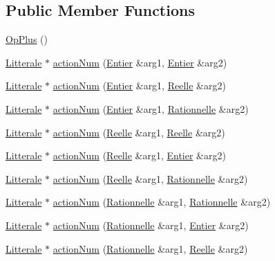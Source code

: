 \subsection*{Public Member Functions}
\begin{DoxyCompactItemize}
\item 
\hyperlink{class_op_plus_a24d0bebd30dbe0668a865ff3ec764754}{Op\+Plus} ()
\item 
\hyperlink{class_litterale}{Litterale} $\ast$ \hyperlink{class_op_plus_a8e7ac9ee5f38f2cca430f1706d584718}{action\+Num} (\hyperlink{class_entier}{Entier} \&arg1, \hyperlink{class_entier}{Entier} \&arg2)
\item 
\hyperlink{class_litterale}{Litterale} $\ast$ \hyperlink{class_op_plus_ab9b4c19f86d38cefce73149b6ba64c62}{action\+Num} (\hyperlink{class_entier}{Entier} \&arg1, \hyperlink{class_reelle}{Reelle} \&arg2)
\item 
\hyperlink{class_litterale}{Litterale} $\ast$ \hyperlink{class_op_plus_a1bd2043754510788fd63ee0fb56d6f85}{action\+Num} (\hyperlink{class_entier}{Entier} \&arg1, \hyperlink{class_rationnelle}{Rationnelle} \&arg2)
\item 
\hyperlink{class_litterale}{Litterale} $\ast$ \hyperlink{class_op_plus_a6ed45e405fa7813701cd0da3a60c54b5}{action\+Num} (\hyperlink{class_reelle}{Reelle} \&arg1, \hyperlink{class_reelle}{Reelle} \&arg2)
\item 
\hyperlink{class_litterale}{Litterale} $\ast$ \hyperlink{class_op_plus_a11f699dbaa9968c904388cfd1e847aa5}{action\+Num} (\hyperlink{class_reelle}{Reelle} \&arg1, \hyperlink{class_entier}{Entier} \&arg2)
\item 
\hyperlink{class_litterale}{Litterale} $\ast$ \hyperlink{class_op_plus_afff58a511d72d5750106dbad8b338d08}{action\+Num} (\hyperlink{class_reelle}{Reelle} \&arg1, \hyperlink{class_rationnelle}{Rationnelle} \&arg2)
\item 
\hyperlink{class_litterale}{Litterale} $\ast$ \hyperlink{class_op_plus_ad2d1f23e6d720812d5ce1b80391dd245}{action\+Num} (\hyperlink{class_rationnelle}{Rationnelle} \&arg1, \hyperlink{class_rationnelle}{Rationnelle} \&arg2)
\item 
\hyperlink{class_litterale}{Litterale} $\ast$ \hyperlink{class_op_plus_a0b5692ab8e196caf4ecb7a38a211d4a7}{action\+Num} (\hyperlink{class_rationnelle}{Rationnelle} \&arg1, \hyperlink{class_entier}{Entier} \&arg2)
\item 
\hyperlink{class_litterale}{Litterale} $\ast$ \hyperlink{class_op_plus_ad30b29e881f0bee0af3a97d155b53c51}{action\+Num} (\hyperlink{class_rationnelle}{Rationnelle} \&arg1, \hyperlink{class_reelle}{Reelle} \&arg2)
\end{DoxyCompactItemize}

